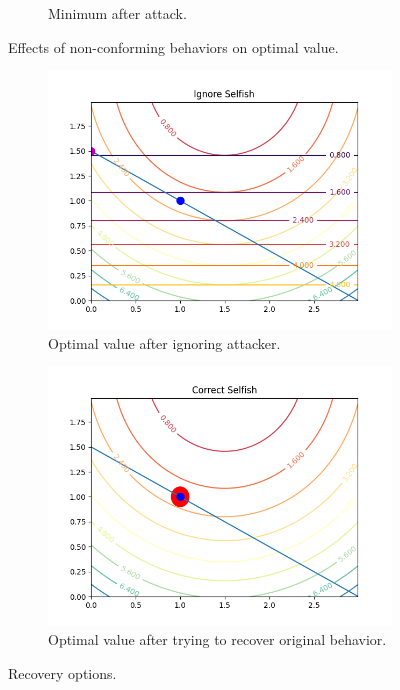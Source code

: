 \documentclass[../main.tex]{subfiles}
\begin{document}
\begin{figure}[h]
\begin{subfigure}{0.45\textwidth}
    \caption{Minimum after attack.}
    \label{fig:second}
  \end{subfigure}
  \caption{Effects of non-conforming behaviors on optimal value. }
  \label{fig:figures}
\end{figure}

\begin{figure}[h]
  \centering
  \begin{subfigure}{0.45\textwidth}
    \includegraphics[width=\textwidth]{../img/ignoreX.png}
    \caption{Optimal value after ignoring attacker.}
    \label{fig:third}
  \end{subfigure}
  \hfill
  \begin{subfigure}{0.45\textwidth}
    \includegraphics[width=\textwidth]{../img/correctX.png}
    \caption{Optimal value after trying to recover original behavior.}
    \label{fig:third}
  \end{subfigure}

  \caption{Recovery options.}\label{fig:figures}
\end{figure}
\end{document}
